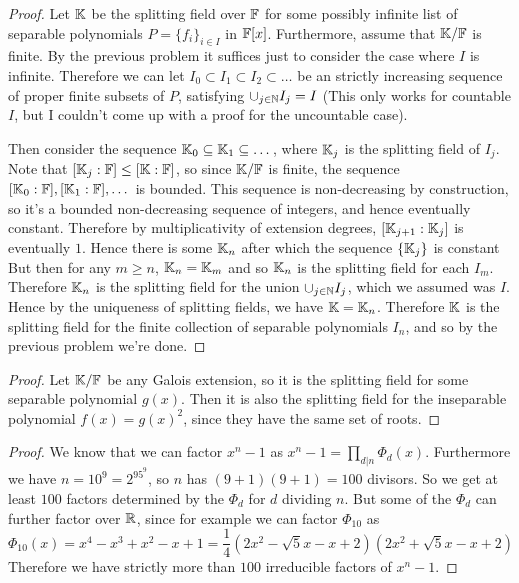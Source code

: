 \documentclass[11pt]{article}
\begin{document}
\begin{proof}
  Let $\mathbb{K}$ be the splitting field over $\mathbb{F}$ for some possibly infinite list of separable polynomials $P = \{f_i\}_{i \in I}$ in $\mathbb{F}[x]$.
  Furthermore, assume that $\mathbb{K}/\mathbb{F}$ is finite.
  By the previous problem it suffices just to consider the case where $I$ is infinite.
  Therefore we can let $I_0 \subset I_1 \subset I_2 \subset \dots$ be an strictly increasing sequence of proper finite subsets of $P$, satisfying $\cup_{j \in \mathbb{N}} I_j = I$ (This only works for countable $I$, but I couldn't come up with a proof for the uncountable case).

  Then consider the sequence $\mathbb{K}_0 \subseteq \mathbb{K}_1 \subseteq \dots$, where $\mathbb{K}_j$ is the splitting field of $I_j$.
  Note that $[\mathbb{K}_j:\mathbb{F}] \le [\mathbb{K}:\mathbb{F}]$, so since $\mathbb{K}/\mathbb{F}$ is finite, the sequence $[\mathbb{K}_0:\mathbb{F}], [\mathbb{K}_1:\mathbb{F}], \dots$ is bounded.
  This sequence is non-decreasing by construction, so it's a bounded non-decreasing sequence of integers, and hence eventually constant.
  Therefore by multiplicativity of extension degrees, $[\mathbb{K}_{j+1}:\mathbb{K}_j]$ is eventually $1$.
  Hence there is some $\mathbb{K}_n$ after which the sequence $\{\mathbb{K}_j\}$ is constant %
  But then for any $m \ge n$, $\mathbb{K}_n = \mathbb{K}_m$ and so $\mathbb{K}_n$ is the splitting field for each $I_m$.
  Therefore $\mathbb{K}_n$ is the splitting field for the union $\cup_{j \in \mathbb{N}} I_j$, which we assumed was $I$.
  Hence by the uniqueness of splitting fields, we have $\mathbb{K} = \mathbb{K}_n$.
  Therefore $\mathbb{K}$ is the splitting field for the finite collection of separable polynomials $I_n$, and so by the previous problem we're done.
\end{proof}

\begin{proof}
  Let $\mathbb{K}/\mathbb{F}$ be any Galois extension, so it is the splitting field for some separable polynomial $g(x)$.
  Then it is also the splitting field for the inseparable polynomial $f(x) = g(x)^2$, since they have the same set of roots.
\end{proof}

\begin{proof}
  We know that we can factor $x^n - 1$ as $x^n - 1 = \prod_{d | n} \Phi_d(x)$.
  Furthermore we have $n = 10^9 = 2^95^9$, so $n$ has $(9+1)(9+1) = 100$ divisors.
  So we get at least $100$ factors determined by the $\Phi_d$ for $d$ dividing $n$.
  But some of the $\Phi_d$ can further factor over $\mathbb{R}$, since for example we can factor $\Phi_{10}$ as
  \begin{equation*}
    \Phi_{10}(x) = x^4-x^3+x^2-x+1
    = \frac{1}{4}(2x^2 - \sqrt{5}x - x + 2)(2x^2 + \sqrt{5}x - x + 2)
  \end{equation*}
  Therefore we have strictly more than $100$ irreducible factors of $x^n - 1$.
\end{proof}
\end{document}
